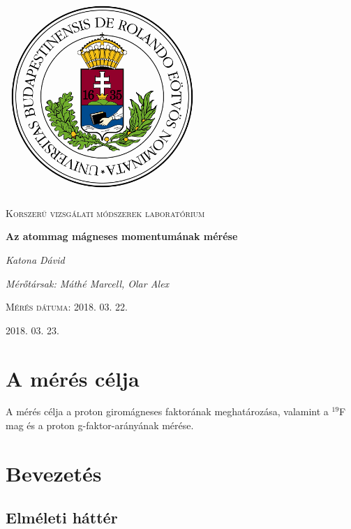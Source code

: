 \documentclass[a4paper,12pt]{article}
\begin{document}
 
\begin{titlepage}
	\centering
	\includegraphics[width=0.55\textwidth]{elte.png}\par\vspace{1cm}
	{\scshape\LARGE Korszerű vizsgálati módszerek laboratórium \par}
	
	\vspace{1cm}
	{\huge\bfseries Az atommag mágneses momentumának mérése\par}
	\vspace{1cm}
	{\Large\itshape Katona Dávid\par}
	\vspace{1cm}
	{\itshape Mérőtársak: Máthé Marcell, Olar Alex\par}
	\vspace{0.5cm}
	{\scshape Mérés dátuma: 2018. 03. 22.\par}


	\vfill

	{\large  2018. 03. 23.\par}
\end{titlepage}


\tableofcontents

\newpage

\section{A mérés célja}
A mérés célja a proton giromágneses faktorának meghatározása, valamint a $^{19}$F mag és a proton g-faktor-arányának mérése.

\section{Bevezetés}
\subsection{Elméleti háttér}
\end{document}
